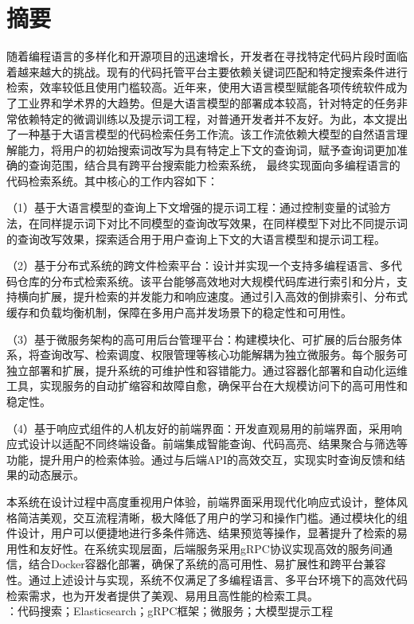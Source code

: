 \documentclass[UTF8,a4paper,12pt]{ctexart}
\numberwithin{equation}{section}
\begin{document}
\section*{摘\quad 要}
随着编程语言的多样化和开源项目的迅速增长，开发者在寻找特定代码片段时面临着越来越大的挑战。现有的代码托管平台主要依赖关键词匹配和特定搜索条件进行检索，效率较低且使用门槛较高。近年来，使用大语言模型赋能各项传统软件成为了工业界和学术界的大趋势。但是大语言模型的部署成本较高，针对特定的任务非常依赖特定的微调训练以及提示词工程，对普通开发者并不友好。为此，本文提出了一种基于大语言模型的代码检索任务工作流。该工作流依赖大模型的自然语言理解能力，将用户的初始搜索词改写为具有特定上下文的查询词，赋予查询词更加准确的查询范围，结合具有跨平台搜索能力检索系统， 最终实现面向多编程语言的代码检索系统。其中核心的工作内容如下：\par
（1）基于大语言模型的查询上下文增强的提示词工程：通过控制变量的试验方法，在同样提示词下对比不同模型的查询改写效果，在同样模型下对比不同提示词的查询改写效果，探索适合用于用户查询上下文的大语言模型和提示词工程。\par
（2）基于分布式系统的跨文件检索平台：设计并实现一个支持多编程语言、多代码仓库的分布式检索系统。该平台能够高效地对大规模代码库进行索引和分片，支持横向扩展，提升检索的并发能力和响应速度。通过引入高效的倒排索引、分布式缓存和负载均衡机制，保障在多用户高并发场景下的稳定性和可用性。\par
（3）基于微服务架构的高可用后台管理平台：构建模块化、可扩展的后台服务体系，将查询改写、检索调度、权限管理等核心功能解耦为独立微服务。每个服务可独立部署和扩展，提升系统的可维护性和容错能力。通过容器化部署和自动化运维工具，实现服务的自动扩缩容和故障自愈，确保平台在大规模访问下的高可用性和稳定性。\par
（4）基于响应式组件的人机友好的前端界面：开发直观易用的前端界面，采用响应式设计以适配不同终端设备。前端集成智能查询、代码高亮、结果聚合与筛选等功能，提升用户的检索体验。通过与后端API的高效交互，实现实时查询反馈和结果的动态展示。\par
本系统在设计过程中高度重视用户体验，前端界面采用现代化响应式设计，整体风格简洁美观，交互流程清晰，极大降低了用户的学习和操作门槛。通过模块化的组件设计，用户可以便捷地进行多条件筛选、结果预览等操作，显著提升了检索的易用性和友好性。在系统实现层面，后端服务采用gRPC协议实现高效的服务间通信，结合Docker容器化部署，确保了系统的高可用性、易扩展性和跨平台兼容性。通过上述设计与实现，系统不仅满足了多编程语言、多平台环境下的高效代码检索需求，也为开发者提供了美观、易用且高性能的检索工具。
~\\
：代码搜索；Elasticsearch；gRPC框架；微服务；大模型提示工程\\
\end{document}
